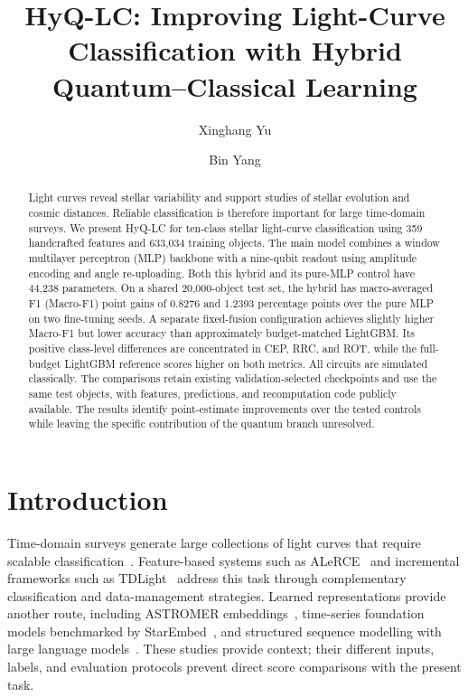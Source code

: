 \documentclass[aps,a4paper,onecolumn,11pt,unpublished]{quantumarticle}
\begin{document}
\title{HyQ-LC: Improving Light-Curve Classification with Hybrid Quantum--Classical Learning}

\author[orcid=0009-0000-4773-6574]{Xinghang Yu}
\author[orcid=0000-0002-3783-2228]{Bin Yang}

\begin{abstract}
Light curves reveal stellar variability and support studies of stellar evolution and cosmic distances. Reliable classification is therefore important for large time-domain surveys. We present HyQ-LC for ten-class stellar light-curve classification using 359 handcrafted features and 633{,}034 training objects. The main model combines a window multilayer perceptron (MLP) backbone with a nine-qubit readout using amplitude encoding and angle re-uploading. Both this hybrid and its pure-MLP control have 44{,}238 parameters. On a shared 20{,}000-object test set, the hybrid has macro-averaged F1 (Macro-F1) point gains of 0.8276 and 1.2393 percentage points over the pure MLP on two fine-tuning seeds. A separate fixed-fusion configuration achieves slightly higher Macro-F1 but lower accuracy than approximately budget-matched LightGBM. Its positive class-level differences are concentrated in CEP, RRC, and ROT, while the full-budget LightGBM reference scores higher on both metrics. All circuits are simulated classically. The comparisons retain existing validation-selected checkpoints and use the same test objects, with features, predictions, and recomputation code publicly available. The results identify point-estimate improvements over the tested controls while leaving the specific contribution of the quantum branch unresolved.
\end{abstract}

\maketitle

\section{Introduction}

Time-domain surveys generate large collections of light curves that require scalable classification~\cite{moriwaki2023}. Feature-based systems such as ALeRCE~\cite{alerce2021} and incremental frameworks such as TDLight~\cite{tdlight2026} address this task through complementary classification and data-management strategies. Learned representations provide another route, including ASTROMER embeddings~\cite{astromer2023}, time-series foundation models benchmarked by StarEmbed~\cite{starembed2026}, and structured sequence modelling with large language models~\cite{shao2026}. These studies provide context; their different inputs, labels, and evaluation protocols prevent direct score comparisons with the present task.
\end{document}
